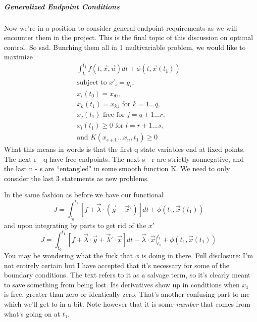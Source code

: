 \documentclass[11pt]{article}
\numberwithin{equation}{section}
\begin{document}
\subparagraph{Generalized Endpoint Conditions}
Now we're in a position to consider general endpoint requirements as we will encounter them in the project. This is the final topic of this discussion on optimal control. So sad. Bunching them all in 1 multivariable problem, we would like to maximize
\begin{align}
\int_{t_0}^{t_1}f(t,\vec{x},\vec{u})dt + \phi(t,\vec{x}(t_1)) \\
\text{subject to } x'_i = g_i, \\
x_i(t_0) = x_{i0}, \\
x_k(t_1) = x_{k1} \text{ for }k = 1...q, \\
x_j(t_1) \text{ free for }j = q+1...r, \\
x_l(t_1) \geq 0 \text{ for } l = r+1...s, \\
\text{and }K(x_{s+1}...x_n,t_1) \geq 0
\end{align}
What this means in words is that the first q state variables end at fixed points. The next r - q have free endpoints. The next s - r are strictly nonnegative, and the last n - s are ``entangled" in some smooth function K. We need to only consider the last 3 statements as new problems.

In the same fashion as before we have our functional
\begin{equation}
J = \int_{t_0}^{t_1}[f + \vec{\lambda}\cdot(\vec{g} - \vec{x}')]dt + \phi(t_1,\vec{x}(t_1))
\end{equation}
and upon integrating by parts to get rid of the $x'$
\begin{equation}
J = \int_{t_0}^{t_1}[f + \vec{\lambda}\cdot\vec{g} + \vec{\lambda}'\cdot\vec{x}]dt - \vec{\lambda}\cdot\vec{x}|_{t_0}^{t_1} + \phi(t_1,\vec{x}(t_1))
\end{equation}
You may be wondering what the fuck that $\phi$ is doing in there. Full disclosure: I'm not entirely certain but I have accepted that it's necessary for some of the boundary conditions. The text refers to it as a salvage term, so it's clearly meant to save something from being lost. Its derivatives show up in conditions when $x_1$ is free, greater than zero or identically zero. That's another confusing part to me which we'll get to in a bit. Note however that it is some \textit{number} that comes from what's going on at $t_1$.
\end{document}
